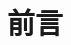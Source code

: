 \documentclass[12pt,oneside]{ctexbook}
\begin{document}


\maketitle
\frontmatter



\chapter*{前言}
\end{document}
